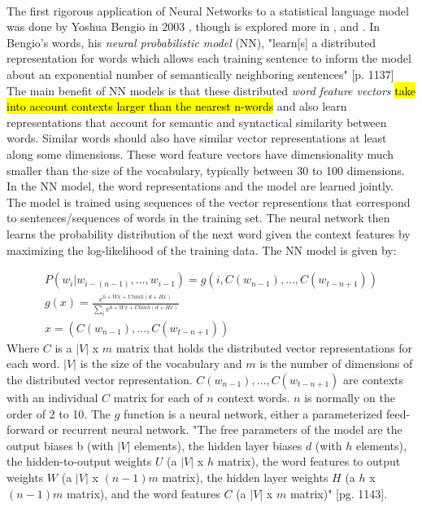 \documentclass[12pt]{ociamthesis}
\begin{document}
\paragraph{}
The first rigorous application of Neural Networks to a statistical language model was done by Yoshua Bengio in 2003 \cite{Bengio2003}, though is explored more in \cite{Collobert2008}, and \cite{HuangEtAl2012} . In Bengio's words, his \emph{neural probabilistic model} (NN), "learn[s] a distributed representation for words which allows each training sentence to inform the model about an exponential number of semantically neighboring sentences" \cite{Bengio2003}[p. 1137] The main benefit of NN models is that these distributed \emph{word feature vectors} \hl{take into account contexts larger than the nearest n-words} and also learn representations that account for semantic and syntactical similarity between words. Similar words should also have similar vector representations at least along some dimensions. These word feature vectors have dimensionality much smaller than the size of the vocabulary, typically between 30 to 100 dimensions. In the NN model, the word representations and the model are learned jointly. The model is trained using sequences of the vector representions that correspond to sentences/sequences of words in the training set. The neural network then learns the probability distribution of the next word given the context features by maximizing the log-likelihood of the training data. 
The NN model is given by:

\begin{align}
P(w_i | w_{i-(n-1)},\dots, w_{i-1}) = g\left( i, C(w_{n-1}), \dots, C(w_{t-n+1}) \right)
\\g(x) = \frac {e^{b+Wx+Utanh(d+Hx)}} {\sum_i e^{b+Wx+Utanh(d+Hx)}}
\\x=\left(C(w_{n-1}), \dots, C(w_{t-n+1})\right)
\end{align}
Where $C$ is a $|V|$ x $m$ matrix that holds the distributed vector representations for each word.  $|V|$ is the size of the vocabulary and $m$ is the number of dimensions of the distributed vector representation. $C(w_{n-1}), \dots, C(w_{t-n+1})$ are contexts with an individual $C$ matrix for each of $n$ context words. $n$ is normally on the order of 2 to 10. The $g$ function is a neural network, either a parameterized feed-forward or recurrent neural network. 
"The free parameters of the model are the output biases b (with $|V|$ elements), the hidden layer biases $d$ (with $h$ elements), the hidden-to-output weights $U$ (a $|V|$ x $h$ matrix), the word features to output weights $W$ (a $|V|$ x $(n-1)m$ matrix), the hidden layer weights $H$ (a $h$ x $(n-1)m$ matrix), and the word features $C$ (a $|V|$ x $m$ matrix)" \cite{Bengio2003}[pg. 1143].
\end{document}
